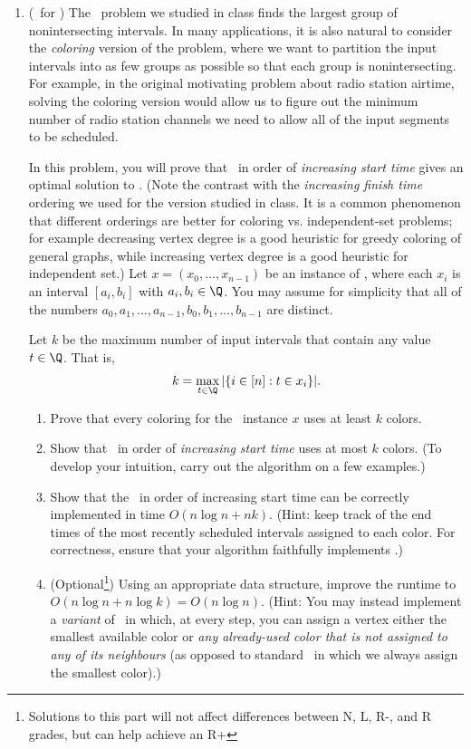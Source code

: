 \documentclass[11pt]{article}
\begin{document}
\begin{enumerate}
 \item (\GreedyColoring\ for \IntervalScheduling) The \IntervalSchedulingOptimization\ problem we studied in class finds the largest group of nonintersecting intervals.
 In many applications, it is also natural to consider the {\em coloring} version of the problem, where we want to partition the input intervals into as few groups as possible so that each group is nonintersecting.
 For example, in the original motivating problem about radio station airtime, solving the coloring version would allow us to figure out the minimum number of radio station channels we need to allow all of the input segments to be scheduled.

 In this problem, you will prove that \GreedyColoring\ in order of {\em increasing start time} gives an optimal solution to \IntervalSchedulingColoring.  (Note the contrast with the {\em increasing finish time} ordering we used for the version studied in class. It is a common phenomenon that different orderings are better for coloring vs. independent-set problems; for example decreasing vertex degree is a good heuristic for greedy coloring of general graphs, while increasing vertex degree is a good heuristic for independent set.)  Let $x=(x_0,\ldots,x_{n-1})$ be an instance of \IntervalScheduling, where each $x_i$ is an interval $[a_i,b_i]$ with $a_i,b_i\in \Q$.  You may assume for simplicity that all of the numbers $a_0,a_1,\ldots,a_{n-1},b_0,b_1,\ldots,b_{n-1}$ are distinct.

Let $k$ be the maximum number of input intervals that contain any value $t\in \Q$.  That is, $$k = \max_{t\in \Q} |\{ i\in [n]: t\in x_i\}|.$$

 \begin{enumerate}
     \item Prove that every coloring for the \IntervalScheduling\ instance $x$ uses at least $k$ colors.
     \item Show that \GreedyColoring\ in order of {\em increasing start time} uses at most $k$ colors.  (To develop your intuition, carry out the algorithm on a few examples.)
     \item Show that the \GreedyColoring\ in order of increasing start time can be correctly implemented in time $O(n\log n+nk)$.
     (Hint: keep track of the end times of the most recently scheduled intervals assigned to each color.  For correctness, ensure that your algorithm faithfully implements \GreedyColoring.)
     \item (Optional\footnote{Solutions to this part will not affect differences between N, L, R-, and R grades, but can help achieve an R+})
     Using an appropriate data structure, improve the runtime to $O(n\log n+n\log k) = O(n\log n)$.
     (Hint: You may instead implement a \emph{variant} of \GreedyColoring\ in which, at every step, you can assign a vertex either the smallest available color or \emph{any already-used color that is not assigned to any of its neighbours} (as opposed to standard \GreedyColoring\ in which we always assign the smallest color).)
\end{enumerate}


\end{enumerate}
\end{document}
